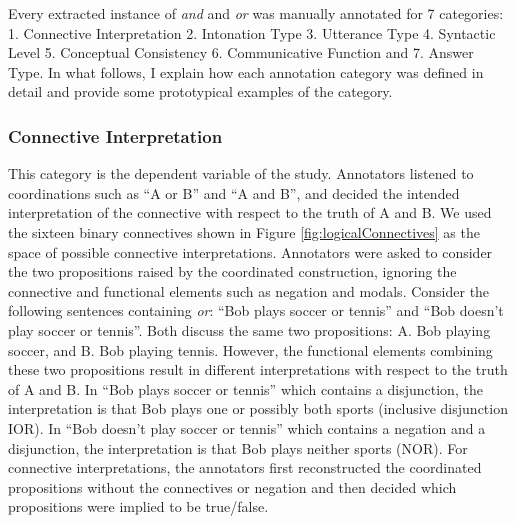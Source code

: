 \documentclass[oneside]{report}
\theoremstyle{definition}
\theoremstyle{definition}
\theoremstyle{definition}
\theoremstyle{remark}
\begin{document}
Every extracted instance of \emph{and} and \emph{or} was manually
annotated for 7 categories: 1. Connective Interpretation 2. Intonation
Type 3. Utterance Type 4. Syntactic Level 5. Conceptual Consistency 6.
Communicative Function and 7. Answer Type. In what follows, I explain
how each annotation category was defined in detail and provide some
prototypical examples of the category.

\subsubsection{Connective
Interpretation}\label{connective-interpretation}

This category is the dependent variable of the study. Annotators
listened to coordinations such as ``A or B'' and ``A and B'', and
decided the intended interpretation of the connective with respect to
the truth of A and B. We used the sixteen binary connectives shown in
Figure \ref{fig:logicalConnectives} as the space of possible connective
interpretations. Annotators were asked to consider the two propositions
raised by the coordinated construction, ignoring the connective and
functional elements such as negation and modals. Consider the following
sentences containing \emph{or}: ``Bob plays soccer or tennis'' and ``Bob
doesn't play soccer or tennis''. Both discuss the same two propositions:
A. Bob playing soccer, and B. Bob playing tennis. However, the
functional elements combining these two propositions result in different
interpretations with respect to the truth of A and B. In ``Bob plays
soccer or tennis'' which contains a disjunction, the interpretation is
that Bob plays one or possibly both sports (inclusive disjunction IOR).
In ``Bob doesn't play soccer or tennis'' which contains a negation and a
disjunction, the interpretation is that Bob plays neither sports (NOR).
For connective interpretations, the annotators first reconstructed the
coordinated propositions without the connectives or negation and then
decided which propositions were implied to be true/false.
\end{document}

